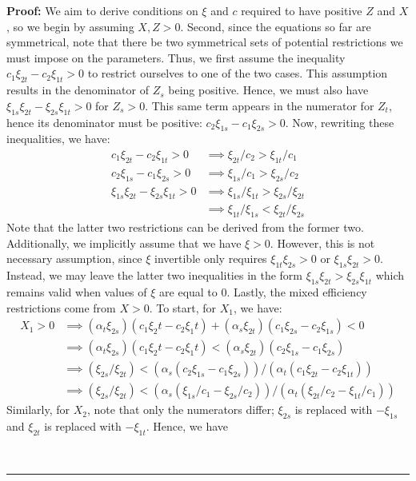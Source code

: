 \documentclass[11pt,a4paper]{extarticle}
\newenvironment{proof}[1][Proof]{\noindent\textbf{#1:} }{\ \rule{0.5em}{0.5em}}
\begin{document}
\begin{proof}
	We aim to derive conditions on $\xi$ and $c$ required to have positive $Z$ and $X$, so we begin by assuming $X, Z  > 0$. Second, since the equations so far are symmetrical, note that there be two symmetrical sets of potential restrictions we must impose on the parameters. Thus, we first assume the inequality $c_1 \xi_{2t} - c_2 \xi_{1t} > 0$ to restrict ourselves to one of the two cases. This assumption results in the denominator of $Z_s$ being positive. Hence, we must also have $\xi_{1s}\xi_{2t} - \xi_{2s}\xi_{1t} > 0 $ for $Z_s > 0$. This same term appears in the numerator for $Z_t$, hence its denominator must be positive: $c_2 \xi_{1s} - c_1 \xi_{2s} > 0$. Now, rewriting these inequalities, we have:
	\begin{align*}
	c_1 \xi_{2t} - c_2 \xi_{1t} > 0 &\implies \xi_{2t}/c_2 > \xi_{1t}/c_1 \\
	c_2 \xi_{1s} - c_1 \xi_{2s} > 0 &\implies \xi_{1s}/c_1 > \xi_{2s}/c_2 \\
	\xi_{1s}\xi_{2t} - \xi_{2s}\xi_{1t} > 0 &\implies \xi_{1s}/\xi_{1t} > \xi_{2s}/\xi_{2t} \\
	&\implies \xi_{1t}/\xi_{1s} < \xi_{2t}/\xi_{2s} 
	\end{align*}
	Note that the latter two restrictions can be derived from the former two. Additionally, we implicitly assume that we have $\xi > 0$. However, this is not necessary assumption, since $\xi$ invertible only requires $\xi_{1t} \xi_{2s} > 0$ or $\xi_{1s} \xi_{2t} > 0$. Instead, we may leave the latter two inequalities in the form $ \xi_{1s}\xi_{2t} > \xi_{2s}\xi_{1t}$ which remains valid when values of $\xi$ are equal to $0$. Lastly, the mixed efficiency restrictions come from $X > 0$. To start, for $X_1$, we have:
	\begin{align*}
	X_1 > 0 &\implies (\alpha_t \xi_{2s})(c_1 \xi_2t - c_2\xi_1t) + (\alpha_s \xi_{2t})(c_1 \xi_{2s} - c_2 \xi_{1s}) < 0\\
	&\implies (\alpha_t \xi_{2s})(c_1 \xi_2t - c_2\xi_1t) < (\alpha_s \xi_{2t})(c_2 \xi_{1s} - c_1 \xi_{2s}) \\
	&\implies (\xi_{2s}/\xi_{2t}) < (\alpha_s (c_2 \xi_{1s} - c_1 \xi_{2s}))/(\alpha_t(c_1 \xi_{2t} - c_2\xi_{1t})) \\
	&\implies (\xi_{2s}/\xi_{2t}) < (\alpha_s (\xi_{1s}/c_1 -  \xi_{2s}/c_2))/(\alpha_t(\xi_{2t}/c_2 - \xi_{1t}/c_1)) 
	\end{align*}
	Similarly, for $X_2$, note that only the numerators differ; $\xi_{2s}$ is replaced with $-\xi_{1s}$ and $\xi_{2t}$ is replaced with $-\xi_{1t}$. Hence, we have

\end{proof}
\end{document}
